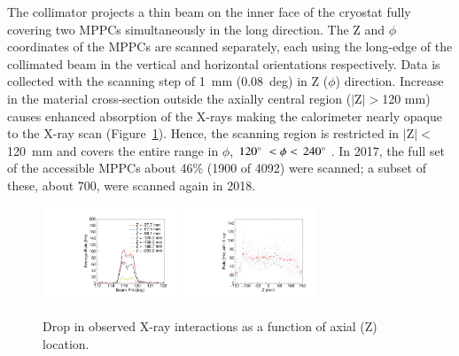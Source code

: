 The collimator projects a thin beam on the inner face of the cryostat
fully covering two MPPCs simultaneously in the long direction.  The Z
and $\phi$ coordinates of the MPPCs are scanned separately, each using
the long-edge of the collimated beam in the vertical and horizontal
orientations respectively. Data is collected with the scanning step of
1~mm (0.08~deg) in Z ($\phi$) direction.  Increase in the material
cross-section outside the axially central region ($|$Z$|>$120 mm)
causes enhanced absorption of the X-rays making the calorimeter nearly
opaque to the X-ray scan (Figure~\ref{fig:ratevsz}).  Hence, the scanning
region is restricted in $|$Z$|<$120~mm and covers the entire range in
$\phi$, $120\mathrm{^{\circ}\hspace{1mm}}<\phi<\,240\mathrm{^{\circ}\hspace{1mm}}$.  In 2017, the full set of the
accessible MPPCs about 46\% (1900 of 4092) were scanned; a subset of
these, about 700, were scanned again in 2018.

\begin{figure}[] 
\includegraphics[width=4cm]{plots/xray_vs_Z}
\includegraphics[width=4cm]{plots/csig_z_phiscan} \caption{Drop in
observed X-ray interactions as a function of axial (Z)  location.}
\label{fig:ratevsz} 
\end{figure}  





